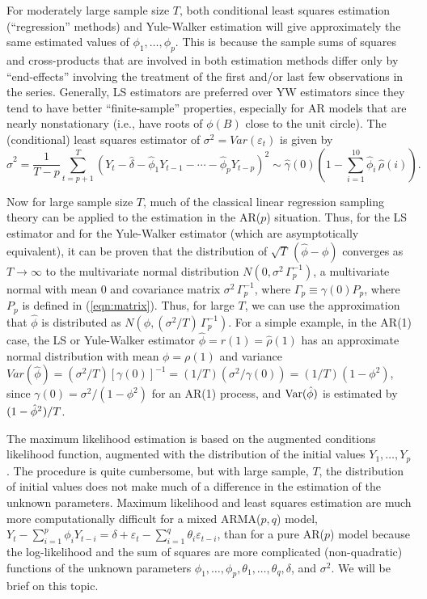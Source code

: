For moderately large sample size $T$, both conditional least squares estimation (``regression'' methods) and Yule-Walker estimation will give approximately the same estimated values of $\phi_1,\ldots,\phi_p$. This is because the sample sums of squares and cross-products that are involved in both estimation methods differ only by ``end-effects'' involving the treatment of the first and/or last few observations in the series. Generally, LS estimators are preferred over YW estimators since they tend to have better ``finite-sample'' properties, especially for AR models that are nearly nonstationary (i.e., have roots of $\phi(B)$ close to the unit circle). The (conditional) least squares estimator of $\sigma^2 = Var(\varepsilon_t)$ is given by
	\[
	\hat{\sigma}^2 =  \frac{1}{T - p}\sum_{t=p+1}^T(Y_t - \hat{\delta} - \hat{\phi}_1Y_{t-1} - \cdots - \hat{\phi}_pY_{t-p})^2 \sim \hat{\gamma}(0) \left( 1 - \sum_{i=1}^{10} \hat{\phi}_i \, \hat{\rho}(i) \right).
	\]


Now for large sample size $T$, much of the classical linear regression sampling theory can be applied to the estimation in the AR($p$) situation. Thus, for the LS estimator and for the Yule-Walker estimator (which are asymptotically equivalent), it can be proven that the distribution of $\sqrt{T}\,(\hat{\phi} - \phi)$ converges as $T \to \infty$ to the multivariate normal distribution $N(0,\sigma^2\,\Gamma_p^{-1})$, a multivariate normal with mean 0 and covariance matrix $\sigma^2\,\Gamma_p^{-1}$, where $\Gamma_p \equiv \gamma(0)P_p$, where $P_p$ is defined in (\ref{eqn:matrix}). Thus, for large $T$, we can use the approximation that $\hat{\phi}$ is distributed as $N(\phi,(\sigma^2/T)\,\Gamma_p^{-1})$. For a simple example, in the AR(1) case, the LS or Yule-Walker estimator $\hat{\phi} = r(1) = \hat{\rho}(1)$ has an approximate normal distribution with mean $\phi = \rho(1)$ and variance $Var(\hat{\phi}) = (\sigma^2/T)[\gamma(0)]^{-1} = (1/T)(\sigma^2/\gamma(0)) = (1/T)(1 - \phi^2)$, since $\gamma(0) = \sigma^2/(1 - \phi^2)$ for an AR(1) process, and $\operatorname{Var}(\hat{\phi})$ is estimated by $(1 - \hat{\phi}^2\hspace{0.01cm})/T$.


The maximum likelihood estimation is based on the augmented conditions likelihood function, augmented with the distribution of the initial values $Y_1, \ldots, Y_p$. The procedure is quite cumbersome, but with large sample, $T$, the distribution of initial values does not make much of a difference in the estimation of the unknown parameters. Maximum likelihood and least squares estimation are much more computationally difficult for a mixed ARMA($p,q$) model, $Y_t - \sum_{i=1}^p \phi_i Y_{t-i} = \delta + \varepsilon_t - \sum_{i=1}^q\theta_i\varepsilon_{t-i}$, than for a pure AR($p$) model because the log-likelihood and the sum of squares are more complicated (non-quadratic) functions of the unknown parameters $\phi_1,\ldots,\phi_p,\theta_1,\ldots,\theta_q, \delta$, and $\sigma^2$. We will be brief on this topic.


